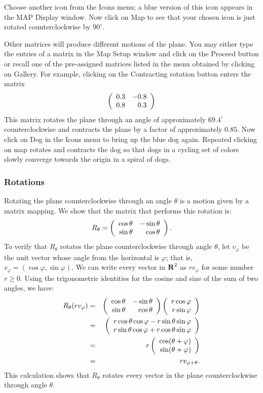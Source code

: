 Choose another icon from the {\sf Icons} menu; a blue version of
this icon appears in the {\sf MAP Display} window.  Now click on
{\sf Map} to see that your chosen icon is just rotated
counterclockwise by $90^\circ$.

Other matrices will produce different motions of the plane.  You
may either type the entries of a matrix in the {\sf Map Setup}
window and click on the {\sf Proceed} button or recall one of
the pre-assigned matrices listed in the menu obtained by
clicking on {\sf Gallery}.  For example, clicking on
the {\sf Contracting rotation} button enters the matrix
\[
\left(\begin{array}{rr} 0.3 & -0.8\\ 0.8 &0.3\end{array}\right)
\]
This matrix rotates the plane through an angle of approximately
$69.4^\circ$ counterclockwise and contracts the plane by a
factor of approximately $0.85$.  Now click on {\sf Dog} in the
{\sf Icons} menu to bring up the blue dog again.  Repeated
clicking on {\sf map} rotates and contracts the dog so that dogs
in a cycling set of colors slowly converge towards the origin in
a spiral of dogs.

\subsubsection*{Rotations}

Rotating the plane counterclockwise through an angle $\theta$ is
a motion given by a matrix mapping.  We show that the matrix that
performs this rotation is:
\begin{equation} \label{e:rotmat}
R_\theta = \left(\begin{array}{rr} \cos\theta & -\sin\theta\\ \sin\theta &\cos\theta\end{array}\right).
\end{equation}
To verify that $R_\theta$ rotates the plane counterclockwise
through angle $\theta$, let $v_\varphi$ be the unit vector whose
angle from the horizontal is $\varphi$; that is,
$v_\varphi=(\cos\varphi,\sin\varphi)$.  We can write every vector in
$\mbox{$\bf{R}$}^2$ as $rv_\varphi$ for some number $r\ge 0$.   Using the 
trigonometric identities for the cosine and sine of the sum of two angles, we
have:
\begin{eqnarray*}
R_\theta (rv_\varphi) & = &
\left(\begin{array}{rr} \cos\theta & -\sin\theta\\ \sin\theta &\cos\theta\end{array}\right)
\left(\begin{array}{r} r\cos\varphi \\ r\sin\varphi\end{array}\right) \\
& = & \left(\begin{array}{r} r\cos\theta\cos\varphi -r\sin\theta\sin\varphi \\ r\sin\theta\cos\varphi + r\cos\theta\sin\varphi\end{array}\right)\\
& = & r\left(\begin{array}{r} \cos(\theta+\varphi) \\ \sin(\theta+\varphi)\end{array}\right)  \\
& = & rv_{\varphi+\theta}.
\end{eqnarray*}
This calculation shows that $R_\theta$ rotates every vector in the plane
counterclockwise through angle $\theta$.

